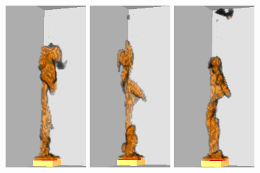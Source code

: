 \documentclass[twoside]{uocthesis}
\begin{document}
{\begin{figure}[p]
	\includegraphics[width=1.2in]{../Figures/FDSNG_Corner4}
	\includegraphics[width=1.2in]{../Figures/FDSNG_Corner5} 
	\includegraphics[width=1.2in]{../Figures/FDSNG_Corner6} \\


\end{figure}}
\end{document}
